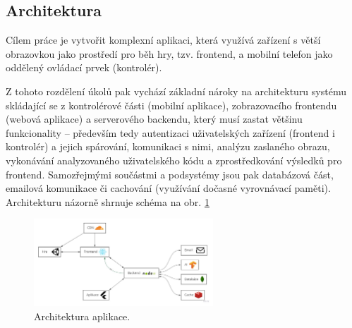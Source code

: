 \subsection{Architektura}

Cílem práce je vytvořit komplexní aplikaci, která využívá zařízení s větší obrazovkou jako prostředí pro běh hry, tzv. frontend, a mobilní telefon jako oddělený ovládací prvek (kontrolér). \par
Z tohoto rozdělení úkolů pak vychází základní nároky na architekturu systému skládající se z kontrolérové části (mobilní aplikace), zobrazovacího frontendu (webová aplikace) a serverového backendu, který musí zastat většinu funkcionality – především tedy autentizaci uživatelských zařízení (frontend i kontrolér) a jejich spárování, komunikaci s nimi, analýzu zaslaného obrazu, vykonávání analyzovaného uživatelského kódu a zprostředkování výsledků pro frontend. Samozřejmými součástmi a podsystémy jsou pak databázová část, emailová komunikace či cachování (využívání dočasné vyrovnávací paměti). Architekturu názorně shrnuje schéma na obr. \ref{fig:architektura}

\begin{figure}[h]
    \centering
    \includegraphics[width=0.6\textwidth]{img/architektura.jpg}
    \caption{Architektura aplikace.}
    \label{fig:architektura}
\end{figure}